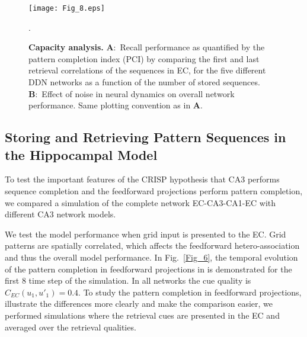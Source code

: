 \documentclass[utf8]{frontiersSCNS} %
\begin{document}
\begin{figure}[!htb]
\centering\texttt{[image: Fig\_8.eps]}
\caption{\textbf{Capacity analysis.} 
\textbf{A}:~Recall performance as quantified by the pattern completion index (PCI) by comparing the first and last retrieval correlations of the sequences in EC, for the five different DDN networks as a function of the number of stored sequences. 
\textbf{B}:~Effect of noise in neural dynamics on overall network performance.
Same plotting convention as in \textbf{A}.
}.   
\label{Fig_8}
\end{figure}


\subsection{Storing and Retrieving Pattern Sequences in the Hippocampal Model}




To test the important features of the CRISP hypothesis that CA3 performs sequence completion and the feedforward projections perform pattern completion, we compared a simulation of the complete network EC-CA3-CA1-EC with different CA3 network models.  

We test the model performance when grid input is presented to the EC. Grid patterns are spatially correlated, which affects the feedforward hetero-association and thus the overall model performance. In Fig.~\ref{Fig_6},  the temporal evolution of the pattern completion in feedforward projections in is demonstrated for the first 8 time step of the simulation. In all networks the cue quality is $C_{EC}(u_1, u'_1) = 0.4$. 
To study the pattern completion in feedforward projections, illustrate the differences more clearly and make the comparison easier, we performed simulations where the retrieval cues  are presented in the EC and averaged over the retrieval qualities.
\end{document}

